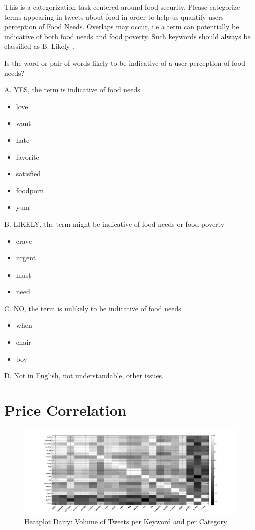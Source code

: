 This is a categorization task centered around food security. Please categorize terms appearing in tweets about food in order to help us quantify users perception of Food Needs. Overlaps may occur, i.e a term can potentially be indicative of both food needs and food poverty. Such keywords should always be classified as B. Likely .

Is the word or pair of words likely to be indicative of a user perception of food needs?

A. YES, the term is indicative of food needs

\begin{itemize}
  \item love
  \item want
  \item hate
  \item favorite 
  \item satisfied
  \item foodporn
  \item yum


\end{itemize}

B. LIKELY, the term might be indicative of food needs or food poverty
\begin{itemize}
  \item crave
  \item urgent
  \item must
  \item need
\end{itemize}

C. NO, the term is unlikely to be indicative of food needs 
\begin{itemize}
  \item when
  \item chair
  \item boy
\end{itemize}

D. Not in English, not understandable, other issues.

\chapter{Price Correlation}
\label{pCorr}


\begin{figure}[H]
        \centering
         \includegraphics[width=1\textwidth ]{img/anal/dairy_test}
              
        \caption{Heatplot Dairy: Volume of Tweets per Keyword and per Category}
        \label{fig:distribution}
\end{figure}
 

